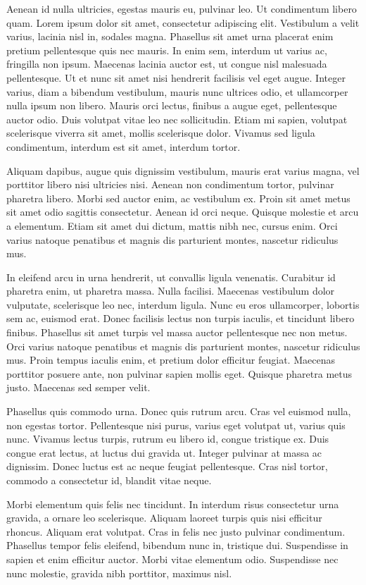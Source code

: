 Aenean id nulla ultricies, egestas mauris eu, pulvinar leo. Ut condimentum libero quam. Lorem ipsum dolor sit amet, consectetur adipiscing elit. Vestibulum a velit varius, lacinia nisl in, sodales magna. Phasellus sit amet urna placerat enim pretium pellentesque quis nec mauris. In enim sem, interdum ut varius ac, fringilla non ipsum. Maecenas lacinia auctor est, ut congue nisl malesuada pellentesque. Ut et nunc sit amet nisi hendrerit facilisis vel eget augue. Integer varius, diam a bibendum vestibulum, mauris nunc ultrices odio, et ullamcorper nulla ipsum non libero. Mauris orci lectus, finibus a augue eget, pellentesque auctor odio. Duis volutpat vitae leo nec sollicitudin. Etiam mi sapien, volutpat scelerisque viverra sit amet, mollis scelerisque dolor. Vivamus sed ligula condimentum, interdum est sit amet, interdum tortor.

Aliquam dapibus, augue quis dignissim vestibulum, mauris erat varius magna, vel porttitor libero nisi ultricies nisi. Aenean non condimentum tortor, pulvinar pharetra libero. Morbi sed auctor enim, ac vestibulum ex. Proin sit amet metus sit amet odio sagittis consectetur. Aenean id orci neque. Quisque molestie et arcu a elementum. Etiam sit amet dui dictum, mattis nibh nec, cursus enim. Orci varius natoque penatibus et magnis dis parturient montes, nascetur ridiculus mus.

In eleifend arcu in urna hendrerit, ut convallis ligula venenatis. Curabitur id pharetra enim, ut pharetra massa. Nulla facilisi. Maecenas vestibulum dolor vulputate, scelerisque leo nec, interdum ligula. Nunc eu eros ullamcorper, lobortis sem ac, euismod erat. Donec facilisis lectus non turpis iaculis, et tincidunt libero finibus. Phasellus sit amet turpis vel massa auctor pellentesque nec non metus. Orci varius natoque penatibus et magnis dis parturient montes, nascetur ridiculus mus. Proin tempus iaculis enim, et pretium dolor efficitur feugiat. Maecenas porttitor posuere ante, non pulvinar sapien mollis eget. Quisque pharetra metus justo. Maecenas sed semper velit.

Phasellus quis commodo urna. Donec quis rutrum arcu. Cras vel euismod nulla, non egestas tortor. Pellentesque nisi purus, varius eget volutpat ut, varius quis nunc. Vivamus lectus turpis, rutrum eu libero id, congue tristique ex. Duis congue erat lectus, at luctus dui gravida ut. Integer pulvinar at massa ac dignissim. Donec luctus est ac neque feugiat pellentesque. Cras nisl tortor, commodo a consectetur id, blandit vitae neque.

Morbi elementum quis felis nec tincidunt. In interdum risus consectetur urna gravida, a ornare leo scelerisque. Aliquam laoreet turpis quis nisi efficitur rhoncus. Aliquam erat volutpat. Cras in felis nec justo pulvinar condimentum. Phasellus tempor felis eleifend, bibendum nunc in, tristique dui. Suspendisse in sapien et enim efficitur auctor. Morbi vitae elementum odio. Suspendisse nec nunc molestie, gravida nibh porttitor, maximus nisl.

